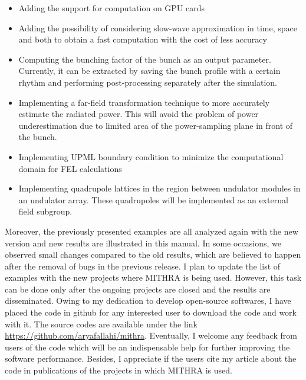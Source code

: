 \begin{itemize}
	\setlength{\parskip}{0pt}
	\setlength{\itemsep}{0pt plus 1pt}
	\item Adding the support for computation on GPU cards
	\item Adding the possibility of considering slow-wave approximation in time, space and both to obtain a fast computation with the cost of less accuracy
	\item Computing the bunching factor of the bunch as an output parameter. Currently, it can be extracted by saving the bunch profile with a certain rhythm and performing post-processing separately after the simulation.
	\item Implementing a far-field transformation technique to more accurately estimate the radiated power. This will avoid the problem of power underestimation due to limited area of the power-sampling plane
	 in front of the bunch.
	\item Implementing UPML boundary condition to minimize the computational domain for FEL calculations
	\item Implementing quadrupole lattices in the region between undulator modules in an undulator array. These quadrupoles will be implemented as an external field subgroup. 
\end{itemize}
%
Moreover, the previously presented examples are all analyzed again with the new version and new results are illustrated in this manual.
%
In some occasions, we observed small changes compared to the old results, which are believed to happen after the removal of bugs in the previous release.
%
I plan to update the list of examples with the new projects where MITHRA is being used.
%
However, this task can be done only after the ongoing projects are closed and the results are disseminated.
%
Owing to my dedication to develop open-source softwares, I have placed the code in github for any interested user to download the code and work with it.
%
The source codes are available under the link \href{https://github.com/aryafallahi/mithra}{https://github.com/aryafallahi/mithra}.
%
Eventually, I welcome any feedback from users of the code which will be an indispensable help for further improving the software performance.
%
Besides, I appreciate if the users cite my article about the code \cite{fallahi2018mithra} in publications of the projects in which MITHRA is used.
